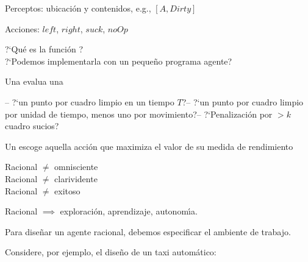 \documentclass{article}
\begin{document}
\begin{huge}

\vspace*{0.3in}

\textwidth
{}

Perceptos: ubicaci{\'o}n y contenidos, e.g., $[A,Dirty]$

Acciones: $left$, $right$, $suck$, $noOp$


%

\medskip



?`Qu{\'e} es la funci{\'o}n ? \\
?`Podemos implementarla con un peque{\~n}o programa agente?




Una  evalua una \al

-- ?`un punto por cuadro limpio en un tiempo $T$?\al -- ?`un punto
por cuadro limpio por unidad de tiempo, menos uno por
movimiento?\al -- ?`Penalizaci{\'o}n por ${}> k$ cuadro sucios?

Un  escoge aquella acci{\'o}n que maximiza el
valor  de su medida de rendimiento 

Racional $\neq$ omnisciente\\
Racional $\neq$ clarividente\\
Racional $\neq$ exitoso

Racional $\implies$ exploraci{\'o}n, aprendizaje, autonom{\'\i}a.



Para dise{\~n}ar un agente racional, debemos especificar el
ambiente de trabajo.

Considere, por ejemplo, el dise{\~n}o de un taxi autom{\'a}tico:






\end{huge}
\end{document}
